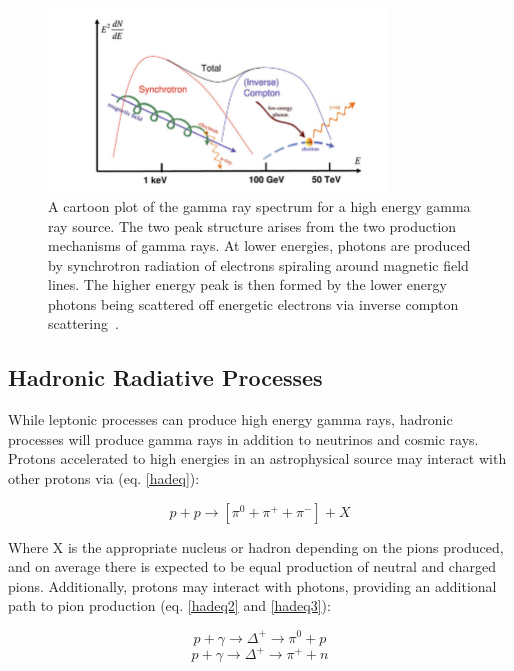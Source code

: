 \begin{figure}[h]
\centering
\includegraphics[width=0.8\textwidth]{figs/toygammaspect.png}
\caption{A cartoon plot of the gamma ray spectrum for a high energy gamma ray source. The two peak structure arises from the two production mechanisms of gamma rays. At lower energies, photons are produced by synchrotron radiation of electrons spiraling around magnetic field lines. The higher energy peak is then formed by the lower energy photons being scattered off energetic electrons via inverse compton scattering~\cite{pimenta_partphys_compton}. }
\label{fig:fermifig}
\end{figure}

\subsection{Hadronic Radiative Processes}
While leptonic processes can produce high energy gamma rays, hadronic processes will produce gamma rays in addition to neutrinos and cosmic rays. Protons accelerated to high energies in an astrophysical source may interact with other protons via (eq. \ref{hadeq}):

\begin{equation}
    p + p \rightarrow [\pi^0 + \pi^+ + \pi^-] + X
\label{hadeq}    
\end{equation}

Where X is the appropriate nucleus or hadron depending on the pions produced, and on average there is expected to be equal production of neutral and charged pions. Additionally, protons may interact with photons, providing an additional path to pion production (eq. \ref{hadeq2} and \ref{hadeq3}):

\begin{equation}
    p + \gamma \rightarrow \Delta^+ \rightarrow \pi^0 + p
\label{hadeq2}    
\end{equation}
\begin{equation}
    p + \gamma \rightarrow \Delta^+ \rightarrow \pi^+ + n
\label{hadeq3}    
\end{equation}

